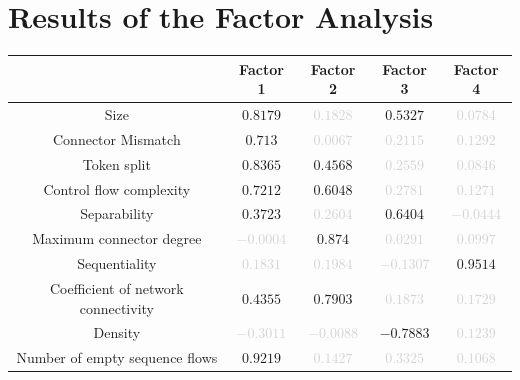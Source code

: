 \documentclass[a4paper]{article}
\begin{document}
\section*{Results of the Factor Analysis}
\begin{center}
\begin{tabular}{ccccc} \toprule 
 & Factor 1 & Factor 2 & Factor 3 & Factor 4 \\ \midrule 
Size & $0.8179$ & \textcolor{lightgray}{$0.1828$} & $0.5327$ & \textcolor{lightgray}{$0.0784$} \\ 
Connector Mismatch & $0.713$ & \textcolor{lightgray}{$0.0067$} & \textcolor{lightgray}{$0.2115$} & \textcolor{lightgray}{$0.1292$} \\ 
Token split & $0.8365$ & $0.4568$ & \textcolor{lightgray}{$0.2559$} & \textcolor{lightgray}{$0.0846$} \\ 
Control flow complexity & $0.7212$ & $0.6048$ & \textcolor{lightgray}{$0.2781$} & \textcolor{lightgray}{$0.1271$} \\ 
Separability & $0.3723$ & \textcolor{lightgray}{$0.2604$} & $0.6404$ & \textcolor{lightgray}{$-0.0444$} \\ 
Maximum connector degree & \textcolor{lightgray}{$-0.0004$} & $0.874$ & \textcolor{lightgray}{$0.0291$} & \textcolor{lightgray}{$0.0997$} \\ 
Sequentiality & \textcolor{lightgray}{$0.1831$} & \textcolor{lightgray}{$0.1984$} & \textcolor{lightgray}{$-0.1307$} & $0.9514$ \\ 
Coefficient of network connectivity & $0.4355$ & $0.7903$ & \textcolor{lightgray}{$0.1873$} & \textcolor{lightgray}{$0.1729$} \\ 
Density & \textcolor{lightgray}{$-0.3011$} & \textcolor{lightgray}{$-0.0088$} & $-0.7883$ & \textcolor{lightgray}{$0.1239$} \\ 
Number of empty sequence flows & $0.9219$ & \textcolor{lightgray}{$0.1427$} & \textcolor{lightgray}{$0.3325$} & \textcolor{lightgray}{$0.1068$} \\ 
\bottomrule
\end{tabular}
\end{center}
\end{document}

